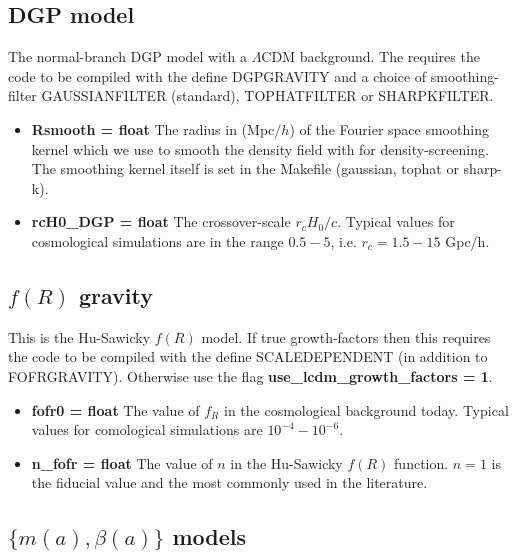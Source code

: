 \documentclass[usenatbib]{article}
\begin{document}
\subsection*{DGP model}

The normal-branch DGP model with a $\Lambda$CDM background. The requires the code to be compiled with the define DGPGRAVITY and a choice of smoothing-filter GAUSSIANFILTER (standard), TOPHATFILTER or SHARPKFILTER.

\begin{itemize}

\item \textbf{Rsmooth = float} The radius in (Mpc$/h$) of the Fourier space smoothing kernel which we use to smooth the density field with for density-screening. The smoothing kernel itself is set in the Makefile (gaussian, tophat or sharp-k).

\item \textbf{rcH0\_DGP = float} The crossover-scale $r_cH_0/c$. Typical values for cosmological simulations are in the range $0.5-5$, i.e. $r_c = 1.5 - 15$ Gpc/h.

\end{itemize}

\subsection*{$f(R)$ gravity}

This is the Hu-Sawicky $f(R)$ model. If true growth-factors then this requires the code to be compiled with the define SCALEDEPENDENT (in addition to FOFRGRAVITY). Otherwise use the flag \textbf{use\_lcdm\_growth\_factors = 1}.

\begin{itemize}

\item \textbf{fofr0 = float} The value of $f_R$ in the cosmological background today. Typical values for comological simulations are $10^{-4}-10^{-6}$.

\item \textbf{n\_fofr = float} The value of $n$ in the Hu-Sawicky $f(R)$ function. $n=1$ is the fiducial value and the most commonly used in the literature.

\end{itemize}

\subsection*{$\{m(a),\beta(a)\}$ models}
\end{document}
